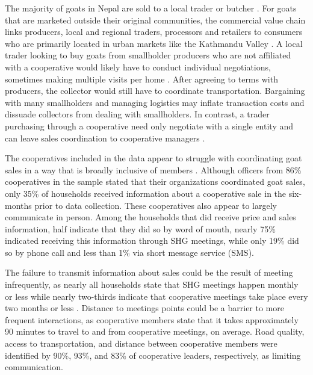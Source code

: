 \documentclass[11pt]{article}
\begin{document}
The majority of goats in Nepal are sold to a local trader or butcher \citep{heifer_international_nepal_study_2012}. For goats that are marketed outside their original communities, the commercial value chain links producers, local and regional traders, processors and retailers to consumers who are primarily located in urban markets like the Kathmandu Valley \citep{heifer_international_nepal_study_2012}. A local trader looking to buy goats from smallholder producers who are not affiliated with a cooperative would likely have to conduct individual negotiations, sometimes making multiple visits per home \citep{heifer_international_nepal_study_2012, staal_smallholder_1997}. After agreeing to terms with producers, the collector would still have to coordinate transportation. Bargaining with many smallholders and managing logistics may inflate transaction costs and dissuade collectors from dealing with smallholders. In contrast, a trader purchasing through a cooperative need only negotiate with a single entity and can leave sales coordination to cooperative managers \citep{mullally_impact_2020}. 

The cooperatives included in the data appear to struggle with coordinating goat sales in a way that is broadly inclusive of members \citep{mullally_impact_2020}. Although officers from 86\% cooperatives in the sample stated that their organizations coordinated goat sales, only 35\% of households received information about a cooperative sale in the six-months prior to data collection. These cooperatives also appear to largely communicate in person. Among the households that did receive price and sales information, half indicate that they did so by word of mouth, nearly 75\% indicated receiving this information through SHG meetings, while only 19\% did so by phone call and less than 1\% via short message service (SMS).

The failure to transmit information about sales could be the result of meeting infrequently, as nearly all households state that SHG meetings happen monthly or less while nearly two-thirds indicate that cooperative meetings take place every two months or less \citep{mullally_impact_2020}. Distance to meetings points could be a barrier to more frequent interactions, as cooperative members state that it takes approximately 90 minutes to travel to and from cooperative meetings, on average. Road quality, access to transportation, and distance between cooperative members were identified by 90\%, 93\%, and 83\% of cooperative leaders, respectively, as limiting communication.
\end{document}
